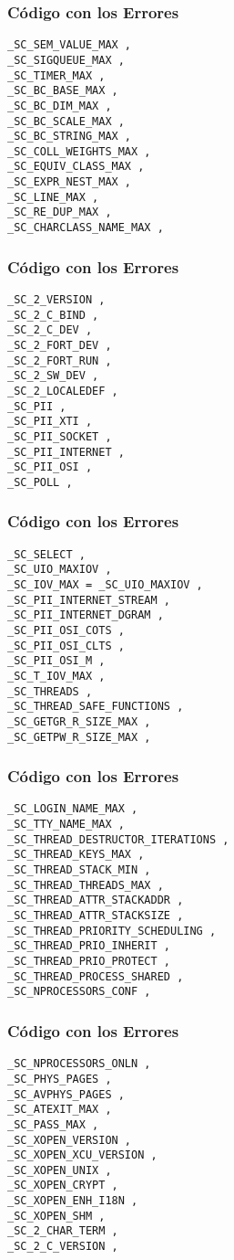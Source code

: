 \documentclass{beamer}
\begin{document}
\begin{frame}[fragile]
\frametitle{C\'odigo con los Errores}
\begin{lstlisting}[style=CStyle]
_SC_SEM_VALUE_MAX , 
_SC_SIGQUEUE_MAX , 
_SC_TIMER_MAX , 
_SC_BC_BASE_MAX , 
_SC_BC_DIM_MAX , 
_SC_BC_SCALE_MAX , 
_SC_BC_STRING_MAX , 
_SC_COLL_WEIGHTS_MAX , 
_SC_EQUIV_CLASS_MAX , 
_SC_EXPR_NEST_MAX , 
_SC_LINE_MAX , 
_SC_RE_DUP_MAX , 
_SC_CHARCLASS_NAME_MAX , 
\end{lstlisting}
\end{frame}
\begin{frame}[fragile]
\frametitle{C\'odigo con los Errores}
\begin{lstlisting}[style=CStyle]
_SC_2_VERSION , 
_SC_2_C_BIND , 
_SC_2_C_DEV , 
_SC_2_FORT_DEV , 
_SC_2_FORT_RUN , 
_SC_2_SW_DEV , 
_SC_2_LOCALEDEF , 
_SC_PII , 
_SC_PII_XTI , 
_SC_PII_SOCKET , 
_SC_PII_INTERNET , 
_SC_PII_OSI , 
_SC_POLL , 
\end{lstlisting}
\end{frame}
\begin{frame}[fragile]
\frametitle{C\'odigo con los Errores}
\begin{lstlisting}[style=CStyle]
_SC_SELECT , 
_SC_UIO_MAXIOV , 
_SC_IOV_MAX = _SC_UIO_MAXIOV , 
_SC_PII_INTERNET_STREAM , 
_SC_PII_INTERNET_DGRAM , 
_SC_PII_OSI_COTS , 
_SC_PII_OSI_CLTS , 
_SC_PII_OSI_M , 
_SC_T_IOV_MAX , 
_SC_THREADS , 
_SC_THREAD_SAFE_FUNCTIONS , 
_SC_GETGR_R_SIZE_MAX , 
_SC_GETPW_R_SIZE_MAX , 
\end{lstlisting}
\end{frame}
\begin{frame}[fragile]
\frametitle{C\'odigo con los Errores}
\begin{lstlisting}[style=CStyle]
_SC_LOGIN_NAME_MAX , 
_SC_TTY_NAME_MAX , 
_SC_THREAD_DESTRUCTOR_ITERATIONS , 
_SC_THREAD_KEYS_MAX , 
_SC_THREAD_STACK_MIN , 
_SC_THREAD_THREADS_MAX , 
_SC_THREAD_ATTR_STACKADDR , 
_SC_THREAD_ATTR_STACKSIZE , 
_SC_THREAD_PRIORITY_SCHEDULING , 
_SC_THREAD_PRIO_INHERIT , 
_SC_THREAD_PRIO_PROTECT , 
_SC_THREAD_PROCESS_SHARED , 
_SC_NPROCESSORS_CONF , 
\end{lstlisting}
\end{frame}
\begin{frame}[fragile]
\frametitle{C\'odigo con los Errores}
\begin{lstlisting}[style=CStyle]
_SC_NPROCESSORS_ONLN , 
_SC_PHYS_PAGES , 
_SC_AVPHYS_PAGES , 
_SC_ATEXIT_MAX , 
_SC_PASS_MAX , 
_SC_XOPEN_VERSION , 
_SC_XOPEN_XCU_VERSION , 
_SC_XOPEN_UNIX , 
_SC_XOPEN_CRYPT , 
_SC_XOPEN_ENH_I18N , 
_SC_XOPEN_SHM , 
_SC_2_CHAR_TERM , 
_SC_2_C_VERSION , 
\end{lstlisting}
\end{frame}
\end{document}
